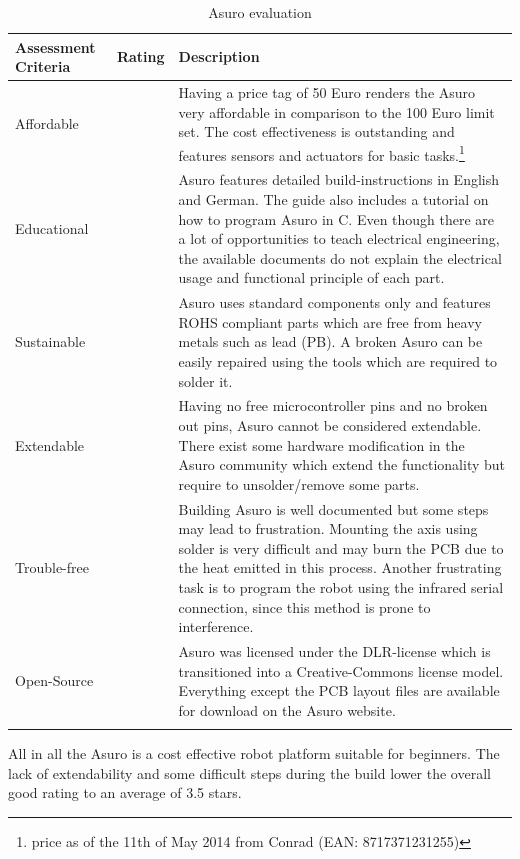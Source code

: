 \begin{longtabu} to \textwidth { X[1,l] X[1,l] X[4,l]}
\toprule
Assessment Criteria    & Rating & Description \\
\midrule
Affordable      &     & Having a price tag of 50 Euro renders the Asuro very affordable in comparison to the 100 Euro limit set. The cost effectiveness is outstanding and features sensors and actuators for basic tasks.\footnote{price as of the 11th of May 2014 from Conrad (EAN: 8717371231255)}\\
Educational     &      & Asuro features detailed build-instructions in English and German. The guide also includes a tutorial on how to program Asuro in C. Even though there are a lot of opportunities to teach electrical engineering, the available documents do not explain the electrical usage and functional principle of each part. \\
Sustainable       &      & Asuro uses standard components only and features ROHS compliant parts which are free from heavy metals such as lead (PB). A broken Asuro can be easily repaired using the tools which are required to solder it. \\
Extendable &       & Having no free microcontroller pins and no broken out pins, Asuro cannot be considered extendable. There exist some hardware modification in the Asuro community which extend the functionality but require to unsolder/remove some parts.  \\
Trouble-free &  & Building Asuro is well documented but some steps may lead to frustration. Mounting the axis using solder is very difficult and may burn the PCB due to the heat emitted in this process. Another frustrating task is to program the robot using the infrared serial connection, since this method is prone to interference. \\
Open-Source &  & Asuro was licensed under the DLR-license which is transitioned into a Creative-Commons license model. Everything except the PCB layout files are available for download on the Asuro website.\\
\bottomrule
\caption{Asuro evaluation}
\label{tbl:asuro_eval}
\end{longtabu}

All in all the Asuro is a cost effective robot platform suitable for beginners. The lack of extendability and some difficult steps during the build lower the overall good rating to an average of 3.5 stars. 


